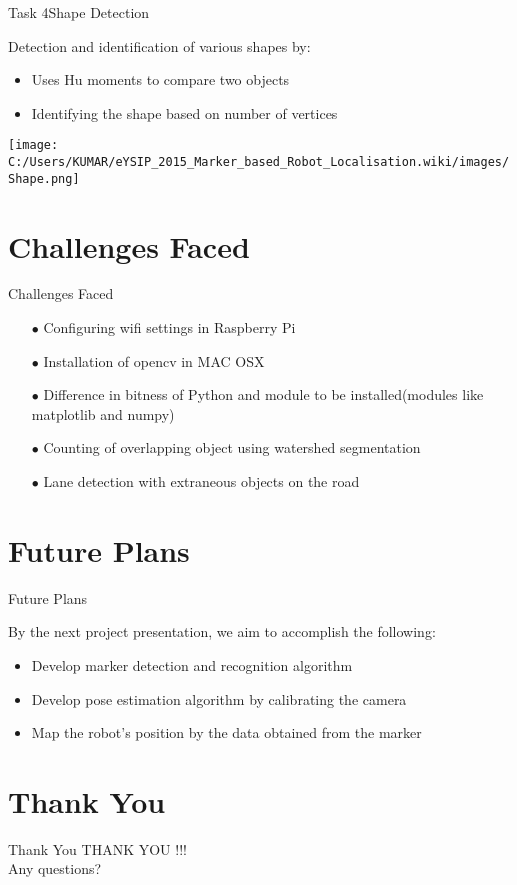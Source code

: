 \documentclass[10pt, a4paper]{beamer}
\begin{document}
\begin{frame}{Task 4}{Shape Detection}
 	\begin{block}{Detection and identification of various shapes by:} \end{block}
	\begin{itemize}
		\item Uses Hu moments to compare two objects
		\item Identifying the shape based on number of vertices
	\end{itemize}
	\begin{minipage}{0.5\textwidth}
		\centering
		\texttt{[image: C:/Users/KUMAR/eYSIP\_2015\_Marker\_based\_Robot\_Localisation.wiki/images/Shape.png]}
		\label{fig:sfig4}
		
		
	\end{minipage}
	
	
\end{frame}	

\section{Challenges Faced}
\begin{frame}{Challenges Faced}
	\begin{itemize}
		
		\item[$\bullet$] Configuring wifi settings in Raspberry Pi
		\item[$\bullet$] Installation of opencv in MAC OSX
		\item[$\bullet$] Difference in bitness of Python and module to be installed(modules like matplotlib and numpy)
		\item[$\bullet$] Counting of overlapping object using watershed segmentation
		\item[$\bullet$] Lane detection with extraneous objects on the road
	\end{itemize}
\end{frame}

\section{Future Plans}
\begin{frame}{Future Plans}
	\begin{block}{By the next project presentation, we aim to accomplish the following:}\end{block}
	\begin{itemize}
		\item Develop marker detection and recognition algorithm
		\item Develop pose estimation algorithm by calibrating the camera
		\item Map the robot's position by the data obtained from the marker
		
	\end{itemize}
\end{frame}


\section{Thank You}
\begin{frame}{Thank You}
	\centering \Large{THANK YOU !!!}\\
    \small Any questions?
\end{frame}
\end{document}
